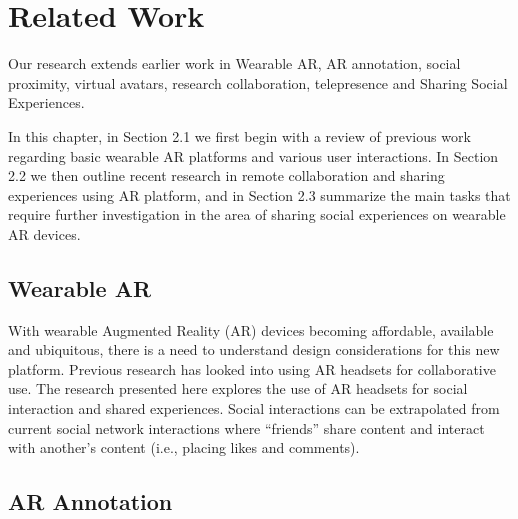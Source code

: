 \chapter{Related Work} %

\label{ch:background} %
Our research extends earlier work in Wearable AR, AR annotation, social proximity, virtual avatars, research collaboration, telepresence and Sharing Social Experiences. 

In this chapter, in Section 2.1 we first begin with a review of previous work regarding basic wearable AR platforms and various user interactions. In Section 2.2 we then outline recent research in remote collaboration and sharing experiences using AR platform, and in Section 2.3 summarize the main tasks that require further investigation in the area of sharing social experiences on wearable AR devices.

\section{Wearable AR}

With wearable Augmented Reality (AR) devices becoming affordable, available and ubiquitous, there is a need to understand design considerations for this new platform. Previous research has looked into using AR headsets for collaborative use. 
The research presented here explores the use of AR headsets for social interaction and shared experiences. Social interactions can be extrapolated from current social network interactions where \enquote{friends} share content and interact with another's content (i.e., placing likes and comments).


\section{AR Annotation}

